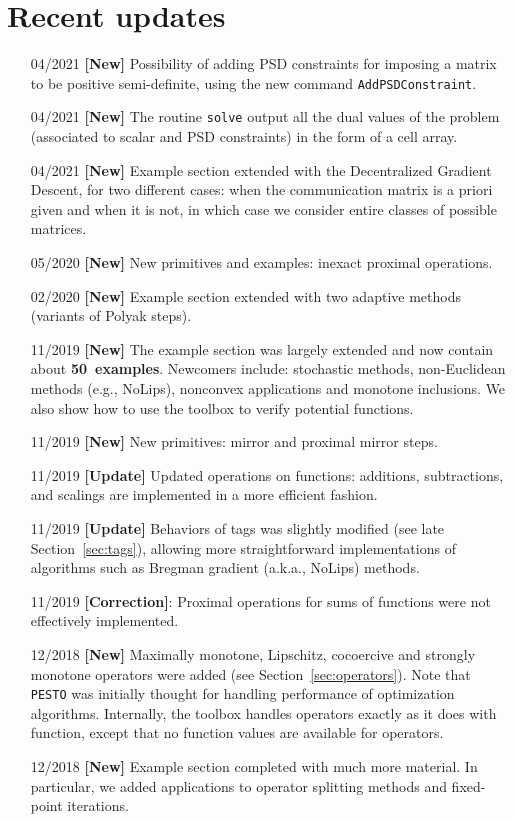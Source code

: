 \documentclass[11pt,a4paper]{article}
\begin{document}
	\section*{Recent updates}
	\begin{itemize}
		\item[04/2021] {\bf{}[New]} Possibility of adding PSD constraints for imposing a matrix to be positive semi-definite, using the new command \verb?AddPSDConstraint?.
		\item[04/2021] {\bf{}[New]} The routine \verb?solve? output all the dual values of the problem (associated to scalar and PSD constraints) in the form of a cell array.
		\item[04/2021] {\bf{}[New]} Example section extended with the Decentralized Gradient Descent, for two different cases: when the communication matrix is a priori given and when it is not, in which case we consider entire classes of possible matrices.
		\item[05/2020] {\bf{}[New]} New primitives and examples: inexact proximal operations.
		\item[02/2020] {\bf{}[New]} Example section extended with two adaptive methods (variants of Polyak steps).
		\item[11/2019] {\bf{}[New]} The example section was largely extended and now contain about {\bf 50~examples}. Newcomers include:  stochastic methods, non-Euclidean methods (e.g., NoLips), nonconvex applications and monotone inclusions. We also show how to use the toolbox to verify potential functions.
		\item[11/2019] {\bf{}[New]} New primitives: mirror and proximal mirror steps.
		\item[11/2019] {\bf{}[Update]} Updated operations on functions: additions, subtractions, and scalings are implemented in a more efficient fashion.
		\item[11/2019] {\bf{}[Update]} Behaviors of tags was slightly modified (see late Section~\ref{sec:tags}), allowing more straightforward implementations of algorithms such as Bregman gradient (a.k.a., NoLips) methods.
		\item[11/2019] {\bf{}[Correction]}: Proximal operations for sums of functions were not effectively implemented.
		\item[12/2018] {\bf{}[New]} Maximally monotone, Lipschitz, cocoercive and strongly monotone operators were added (see Section~\ref{sec:operators}). Note that \verb|PESTO| was initially thought for handling performance of optimization algorithms. Internally, the toolbox handles operators exactly as it does with function, except that no function values are available for operators.
		\item[12/2018] {\bf{}[New]} Example section completed with much more material. In particular, we added applications to operator splitting methods and fixed-point iterations.
	\end{itemize}
\end{document}
